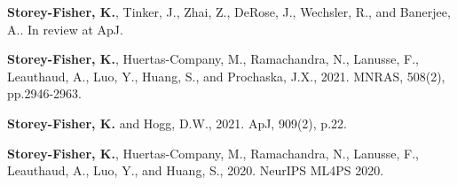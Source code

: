 \item[\arXiv{2210.03203}] \textbf{Storey-Fisher, K.}, Tinker, J., Zhai, Z., DeRose, J., Wechsler, R., and Banerjee, A..  In review at ApJ.
\item[\arXiv{2105.02434}] \textbf{Storey-Fisher, K.}, Huertas-Company, M., Ramachandra, N., Lanusse, F., Leauthaud, A., Luo, Y., Huang, S., and Prochaska, J.X., 2021.  MNRAS, 508(2), pp.2946-2963.
\item[\arXiv{2011.01836}] \textbf{Storey-Fisher, K.} and Hogg, D.W., 2021.  ApJ, 909(2), p.22.
\item[\arXiv{2012.08082}] \textbf{Storey-Fisher, K.}, Huertas-Company, M., Ramachandra, N., Lanusse, F., Leauthaud, A., Luo, Y., and Huang, S., 2020.  NeurIPS ML4PS 2020.